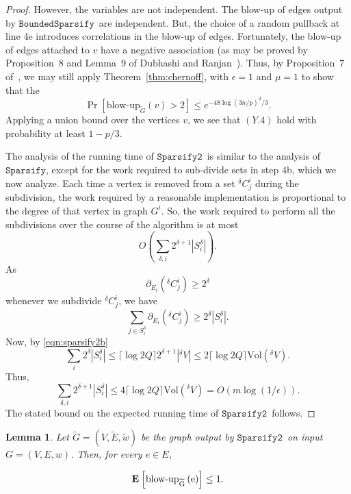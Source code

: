 \documentclass[11pt]{article}
\newtheorem{lemma}[theorem]{Lemma}
\newcommand{\sparsify}{\ensuremath{\mathtt{Sparsify}}}
\newcommand{\sparsifytwo}{\ensuremath{\mathtt{Sparsify2}}}
\newcommand{\boundedsparsify}{\ensuremath{\mathtt{BoundedSparsify}}}
\def\Gtil{\widetilde{G}}
\def\Etil{\widetilde{E}}
\def\wtil{\tilde{w}}
\def\bdry#1#2{\partial_{#1}\left(#2\right)}
\def\prob#1#2{\Pr_{#1}\left[ #2 \right]}
\def\expec#1#2{\mbox{\bf E}_{#1}\left[ #2 \right]}
\def\sizeof#1{\left|#1  \right|}
\newcommand{\ceiling}[1]{\lceil#1\rceil}
\def\vol#1{\mathrm{Vol}\left(#1  \right)}
\def\blowup#1#2{\textrm{blow-up}_{#1}\left( #2 \right)}
\def\preDelta#1{{}^{\delta}\!{#1}}
\begin{document}
\begin{proof}
However, the variables are not independent.
The blow-up of edges output by \boundedsparsify \ are independent.
But, the choice of a random pullback at line 4e introduces correlations
  in the blow-up of edges.
Fortunately, the blow-up of edges attached to $v$ have a negative association
  (as may be proved by Proposition~8 and Lemma~9 of
  Dubhashi and Ranjan~\cite{DubhashiRanjan}).
Thus, by Proposition~7 of~\cite{DubhashiRanjan}, we may still apply
  Theorem~\ref{thm:chernoff}, with $\epsilon = 1$ and $\mu = 1$ to show that the
\[
\prob{}{\blowup{\Gtil}{v} > 2}
\leq
e^{- 48 \log (3 n / p)^{2} / 3}.
\]
Applying a union bound over the vertices $v$, we see that $(Y.4)$
  hold with probability at least $1 - p/3$.

The analysis of the running time of \sparsifytwo \ is similar to
  the analysis of \sparsify, except for the work required to sub-divide
  sets in step 4b, which we now analyze.
Each time a vertex is removed from a set $\preDelta{C}^{i}_{j}$
  during the subdivision, the work required
  by a reasonable implementation is proportional to the degree
  of that vertex in graph $G^{i}$.
So, the work required to perform all the subdivisions over the course
  of the algorithm is at most
\[
  O \left(\sum_{\delta , i} 2^{\delta +1} \sizeof{S^{\delta}_{i}} \right).
\]
As
\[
 \bdry{E_{i}}{\preDelta{C}^{i}_{j}} \geq 2^{\delta }
\]
whenever we subdivide $\preDelta{C}^{i}_{j}$, we have
\[
  \sum_{j \in S^{\delta}_{i}}  \bdry{E_{i}}{\preDelta{C}^{i}_{j}}
 \geq 2^{\delta } \sizeof{S^{\delta}_{i}}.
\]
Now,  by \eqref{eqn:sparsify2b}
\[
\sum_{i}  2^{\delta } \sizeof{S^{\delta}_{i}}
\leq
 \ceiling{\log 2 Q}  2^{\delta + 1}  \sizeof{\preDelta{V}}
\leq
2  \ceiling{\log 2 Q}  \vol{\preDelta{V}}.
\]
Thus,
\[
\sum_{\delta, i} 2^{\delta +1} \sizeof{S^{\delta}_{i}}
\leq
4  \ceiling{\log 2 Q}  \vol{\preDelta{V}}
=
O (m \log (1/\epsilon)).
\]
The stated bound on the expected running time of \sparsifytwo \ follows.
\end{proof}


\begin{lemma}\label{lem:expectedBlowUp}
Let $\Gtil = (V, \Etil , \wtil )$
  be the graph output by \sparsifytwo \ on input $G = (V,E,w)$.
Then, for every $e \in E$,
\end{lemma}
\vspace{-0.2in}
\begin{equation}\label{eqn:blowup}
  \expec{}{{\rm \blowup{\Gtil }{e}}} \leq 1.
\end{equation}
\end{document}
